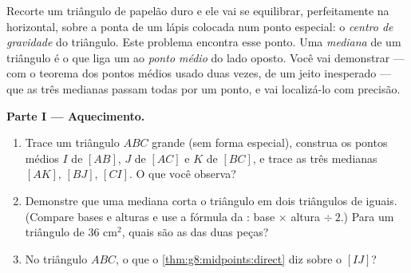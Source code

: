 \begin{problem}
\label{pb:g8:midpoints:1}
Recorte um triângulo de papelão duro e ele vai se equilibrar,
perfeitamente na horizontal, sobre a ponta de um lápis colocada num
ponto especial: o \emph{centro de gravidade}
do triângulo. Este problema encontra esse ponto. Uma
\emph{mediana} de um triângulo é o  que liga um
 ao \emph{ponto médio} do lado oposto. Você vai demonstrar ---
com o teorema dos pontos médios usado duas vezes, de um jeito
inesperado --- que as três medianas passam todas por um ponto, e vai
localizá-lo com precisão.

\medskip
\noindent\textbf{Parte I --- Aquecimento.}
\begin{enumerate}
  \item Trace um triângulo $ABC$ grande (sem forma especial), construa
        os pontos médios $I$ de $[AB]$, $J$ de $[AC]$ e $K$ de $[BC]$,
        e trace as três medianas $[AK]$, $[BJ]$, $[CI]$. O que você
        observa?
  \item Demonstre que uma mediana corta o triângulo em dois triângulos
        de  iguais. (Compare bases e alturas e use a fórmula da
        : base $\times$ altura $\div\ 2$.) Para um triângulo de
         $36$ cm$^2$, quais são as  das duas peças?
  \item No triângulo $ABC$, o que o \cref{thm:g8:midpoints:direct} diz
        sobre o  $[IJ]$?
\end{enumerate}


\end{problem}
